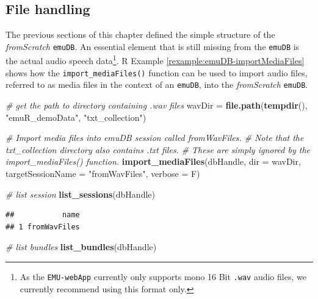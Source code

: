 \documentclass[]{book}
\newenvironment{Shaded}{\begin{snugshade}}{\end{snugshade}}
\newcommand{\CommentTok}[1]{\textcolor[rgb]{0.56,0.35,0.01}{\textit{#1}}}
\newcommand{\DataTypeTok}[1]{\textcolor[rgb]{0.13,0.29,0.53}{#1}}
\newcommand{\KeywordTok}[1]{\textcolor[rgb]{0.13,0.29,0.53}{\textbf{#1}}}
\newcommand{\NormalTok}[1]{#1}
\newcommand{\StringTok}[1]{\textcolor[rgb]{0.31,0.60,0.02}{#1}}
\let\rmarkdownfootnote\footnote%
\def\footnote{\protect\rmarkdownfootnote}
\theoremstyle{definition}
\theoremstyle{definition}
\theoremstyle{definition}
\theoremstyle{remark}
\begin{document}
\hypertarget{file-handling}{%
\subsection{File handling}\label{file-handling}}

The previous sections of this chapter defined the simple structure of
the \emph{fromScratch} \texttt{emuDB}. An essential element that is
still missing from the \texttt{emuDB} is the actual audio speech
data\footnote{As the \texttt{EMU-webApp} currently only supports mono 16
  Bit \texttt{.wav} audio files, we currently recommend using this
  format only.}. R Example \ref{rexample:emuDB-importMediaFiles} shows
how the \texttt{import\_mediaFiles()} function can be used to import
audio files, referred to as media files in the context of an
\texttt{emuDB}, into the \emph{fromScratch} \texttt{emuDB}.

\begin{Shaded}
\begin{Highlighting}[]
\CommentTok{# get the path to directory containing .wav files}
\NormalTok{wavDir =}\StringTok{ }\KeywordTok{file.path}\NormalTok{(}\KeywordTok{tempdir}\NormalTok{(), }\StringTok{"emuR_demoData"}\NormalTok{, }\StringTok{"txt_collection"}\NormalTok{)}

\CommentTok{# Import media files into emuDB session called fromWavFiles.}
\CommentTok{# Note that the txt_collection directory also contains .txt files.}
\CommentTok{# These are simply ignored by the import_mediaFiles() function.}
\KeywordTok{import_mediaFiles}\NormalTok{(dbHandle,}
                  \DataTypeTok{dir =}\NormalTok{ wavDir,}
                  \DataTypeTok{targetSessionName =} \StringTok{"fromWavFiles"}\NormalTok{,}
                  \DataTypeTok{verbose =}\NormalTok{ F)}

\CommentTok{# list session}
\KeywordTok{list_sessions}\NormalTok{(dbHandle)}
\end{Highlighting}
\end{Shaded}

\begin{verbatim}
##           name
## 1 fromWavFiles
\end{verbatim}

\begin{Shaded}
\begin{Highlighting}[]
\CommentTok{# list bundles}
\KeywordTok{list_bundles}\NormalTok{(dbHandle)}
\end{Highlighting}
\end{Shaded}
\end{document}
